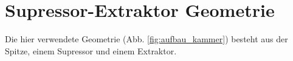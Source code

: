 \documentclass[bachelor,       %
               twoside,        %
               BCOR10mm,       %
               english,ngerman, %
               ]{GAUBM}
\begin{document}

\section{Supressor-Extraktor Geometrie}
Die hier verwendete Geometrie (Abb. \ref{fig:aufbau_kammer}) besteht aus der Spitze, einem Supressor und einem Extraktor.
\end{document}
